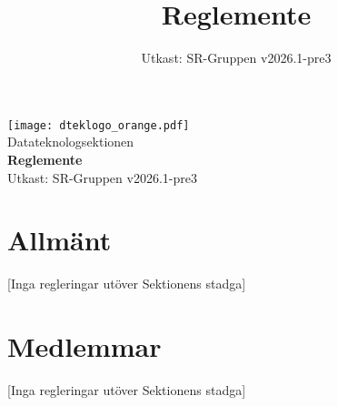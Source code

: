 \documentclass[a4paper]{dteklag}
\title{Reglemente}
\date{Utkast: SR-Gruppen v2026.1-pre3}
\begin{document}
\begin{titlepage}
  \thispagestyle{empty} %
  \vspace*{1cm}
  \begin{center}
    \texttt{[image: dteklogo\_orange.pdf]}\\[3em]
    {\Huge Datateknologsektionen}\\[3em]
    {\Huge \textbf{Reglemente}}\\[1em]
    Utkast: SR-Gruppen v2026.1-pre3
  \end{center}
\end{titlepage}

\makeheadfoot

\setcounter{tocdepth}{2}
\tableofcontents

\section{Allmänt}
\begin{center}
  [Inga regleringar utöver Sektionens stadga]
\end{center}
\section{Medlemmar}
\begin{center}
  [Inga regleringar utöver Sektionens stadga]
\end{center}
\end{document}
